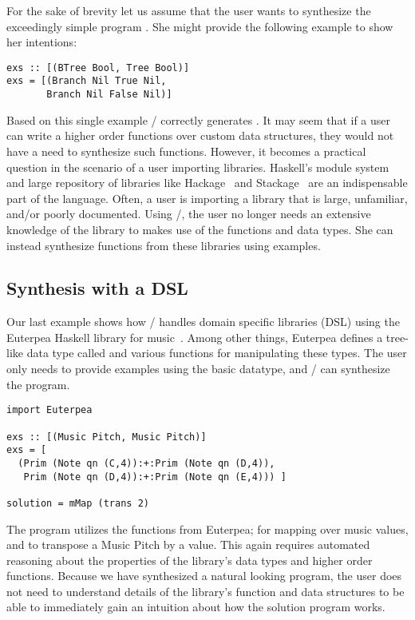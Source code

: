 For the sake of brevity let us assume that the user wants to synthesize
the exceedingly simple program .
She might provide the following example to show her intentions:
\begin{lstlisting}
exs :: [(BTree Bool, Tree Bool)]
exs = [(Branch Nil True Nil,
       Branch Nil False Nil)]
\end{lstlisting}

Based on this single example \ourTool/ correctly generates . It may seem that if a user can write a higher order functions over custom data structures, they would not have a need to synthesize such functions.
However, it becomes a practical question in the scenario of a user importing libraries.
Haskell's module system and large repository of libraries like Hackage~\cite{hackage} and Stackage~\cite{stackage} are an indispensable part of the language.
Often, a user is importing a library that is large, unfamiliar, and/or poorly documented.
Using \ourTool/, the user no longer needs an extensive knowledge of the library to makes use of the functions and data types. She can instead synthesize functions from these libraries using examples.


\subsection{Synthesis with a DSL}

Our last example shows how \ourTool/ handles domain specific libraries (DSL) using the Euterpea Haskell library for music~\cite{euterpea}. 
Among other things, Euterpea defines a tree-like data type called  and various functions for manipulating these types.
The user only needs to provide examples using the basic datatype, and \ourTool/ can synthesize the  program.

\begin{lstlisting}
import Euterpea

exs :: [(Music Pitch, Music Pitch)]
exs = [
  (Prim (Note qn (C,4)):+:Prim (Note qn (D,4)),
   Prim (Note qn (D,4)):+:Prim (Note qn (E,4))) ]
        
solution = mMap (trans 2)
\end{lstlisting}
The  program utilizes the functions from Euterpea;  for mapping over music values, and  to transpose a Music Pitch by a value.
This again requires automated reasoning about the properties of the library's data types and higher order functions.
Because we have synthesized a natural looking program, the user does not need to understand details of the library's function and data structures to be able to immediately gain an intuition about how the solution program works.
